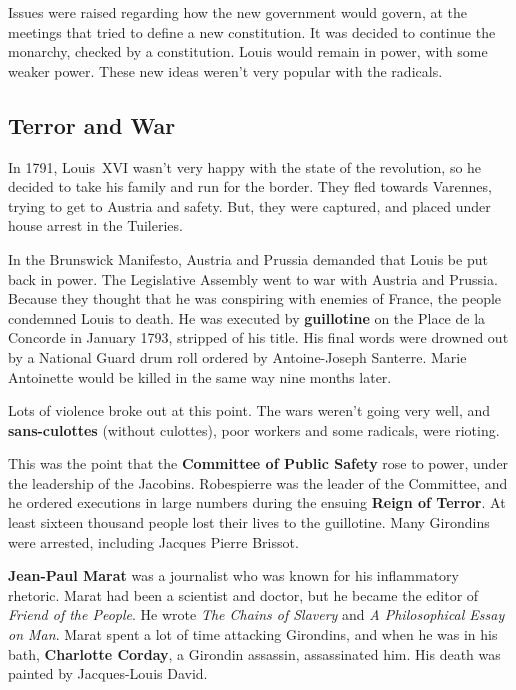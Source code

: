 Issues were raised regarding how the new government would govern,
at the meetings that tried to define a new constitution.
It was decided to continue the monarchy, checked by a constitution.
Louis would remain in power, with some weaker power.
These new ideas weren't very popular with the radicals.

\subsection*{Terror and War}

In 1791, Louis~XVI wasn't very happy with the state of the revolution,
so he decided to take his family and run for the border.
They fled towards Varennes, trying to get to Austria and safety.
But, they were captured, and placed under house arrest in the Tuileries.

In the Brunswick Manifesto, Austria and Prussia demanded that Louis be put back in power.
The Legislative Assembly went to war with Austria and Prussia.
Because they thought that he was conspiring with enemies of France, the people condemned Louis to death.
He was executed by \textbf{guillotine} on the Place de la Concorde in January 1793, stripped of his title.
His final words were drowned out by a National Guard drum roll ordered by Antoine-Joseph Santerre.
Marie Antoinette would be killed in the same way nine months later.


Lots of violence broke out at this point.
The wars weren't going very well, and \textbf{sans-culottes} (without culottes),
poor workers and some radicals, were rioting.

This was the point that the \textbf{Committee of Public Safety} rose to power,
under the leadership of the Jacobins.
Robespierre was the leader of the Committee,
and he ordered executions in large numbers during the ensuing \textbf{Reign of Terror}.
At least sixteen thousand people lost their lives to the guillotine.
Many Girondins were arrested, including Jacques Pierre Brissot.

\textbf{Jean-Paul Marat} was a journalist who was known for his inflammatory rhetoric.
Marat had been a scientist and doctor, but he became the editor of \textit{Friend of the People}.
He wrote \textit{The Chains of Slavery} and \textit{A Philosophical Essay on Man}.
Marat spent a lot of time attacking Girondins, and when he was in his bath,
\textbf{Charlotte Corday}, a Girondin assassin, assassinated him.
His death was painted by Jacques-Louis David.

